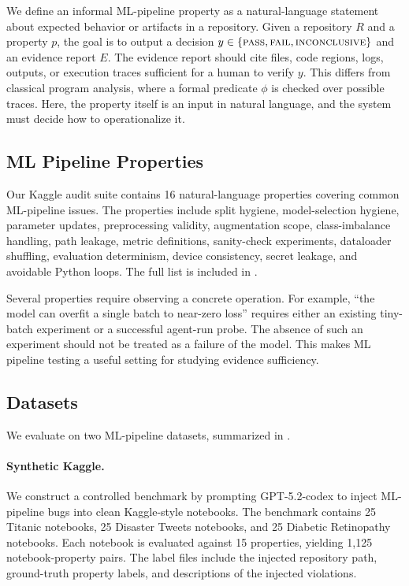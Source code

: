 \documentclass[11pt]{article}
\begin{document}
We define an informal ML-pipeline property as a natural-language statement about expected behavior or artifacts in a repository.
Given a repository $R$ and a property $p$, the goal is to output a decision
$y \in \{\textsc{pass}, \textsc{fail}, \textsc{inconclusive}\}$ and an evidence report $E$.
The evidence report should cite files, code regions, logs, outputs, or execution traces sufficient for a human to verify $y$.
This differs from classical program analysis, where a formal predicate $\phi$ is checked over possible traces.
Here, the property itself is an input in natural language, and the system must decide how to operationalize it.

\subsection{ML Pipeline Properties}

Our Kaggle audit suite contains 16 natural-language properties covering common ML-pipeline issues.
The properties include split hygiene, model-selection hygiene, parameter updates, preprocessing validity, augmentation scope, class-imbalance handling, path leakage, metric definitions, sanity-check experiments, dataloader shuffling, evaluation determinism, device consistency, secret leakage, and avoidable Python loops.
The full list is included in .

Several properties require observing a concrete operation.
For example, ``the model can overfit a single batch to near-zero loss'' requires either an existing tiny-batch experiment or a successful agent-run probe.
The absence of such an experiment should not be treated as a failure of the model.
This makes ML pipeline testing a useful setting for studying evidence sufficiency.

\subsection{Datasets}

We evaluate on two ML-pipeline datasets, summarized in .

\paragraph{Synthetic Kaggle.}
We construct a controlled benchmark by prompting GPT-5.2-codex to inject ML-pipeline bugs into clean Kaggle-style notebooks.
The benchmark contains 25 Titanic notebooks, 25 Disaster Tweets notebooks, and 25 Diabetic Retinopathy notebooks.
Each notebook is evaluated against 15 properties, yielding 1,125 notebook-property pairs.
The label files include the injected repository path, ground-truth property labels, and descriptions of the injected violations.
\end{document}
